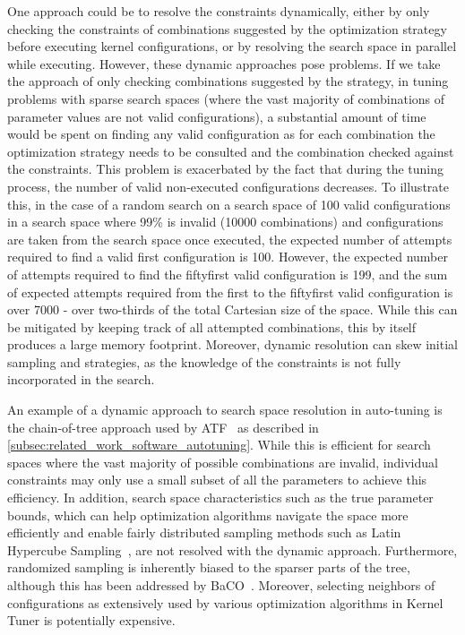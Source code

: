 One approach could be to resolve the constraints dynamically, either by only checking the constraints of combinations suggested by the optimization strategy before executing kernel configurations, or by resolving the search space in parallel while executing. 
However, these dynamic approaches pose problems. 
If we take the approach of only checking combinations suggested by the strategy, in tuning problems with sparse search spaces (where the vast majority of combinations of parameter values are not valid configurations), a substantial amount of time would be spent on finding any valid configuration as for each combination the optimization strategy needs to be consulted and the combination checked against the constraints. 
This problem is exacerbated by the fact that during the tuning process, the number of valid non-executed configurations decreases. To illustrate this, in the case of a random search on a search space of 100 valid configurations in a search space where 99\% is invalid (10000 combinations) and configurations are taken from the search space once executed, the expected number of attempts required to find a valid first configuration is 100. %
However, the expected number of attempts required to find the fiftyfirst valid configuration is 199, and the sum of expected attempts required from the first to the fiftyfirst valid configuration is over 7000 - over two-thirds of the total Cartesian size of the space. %
While this can be mitigated by keeping track of all attempted combinations, this by itself produces a large memory footprint. 
Moreover, dynamic resolution can skew initial sampling and strategies, as the knowledge of the constraints is not fully incorporated in the search. %

An example of a dynamic approach to search space resolution in auto-tuning is the chain-of-tree approach used by ATF~\cite{ATF} as described in \cref{subsec:related_work_software_autotuning}. While this is efficient for search spaces where the vast majority of possible combinations are invalid, individual constraints may only use a small subset of all the parameters to achieve this efficiency. 
In addition, search space characteristics such as the true parameter bounds, which can help optimization algorithms navigate the space more efficiently and enable fairly distributed sampling methods such as Latin Hypercube Sampling~\cite{willemsenBayesianOptimizationAutotuning2021}, are not resolved with the dynamic approach. Furthermore, randomized sampling is inherently biased to the sparser parts of the tree, although this has been addressed by BaCO~\cite{BaCO2024}. Moreover, selecting neighbors of configurations as extensively used by various optimization algorithms in Kernel Tuner is potentially expensive. 

